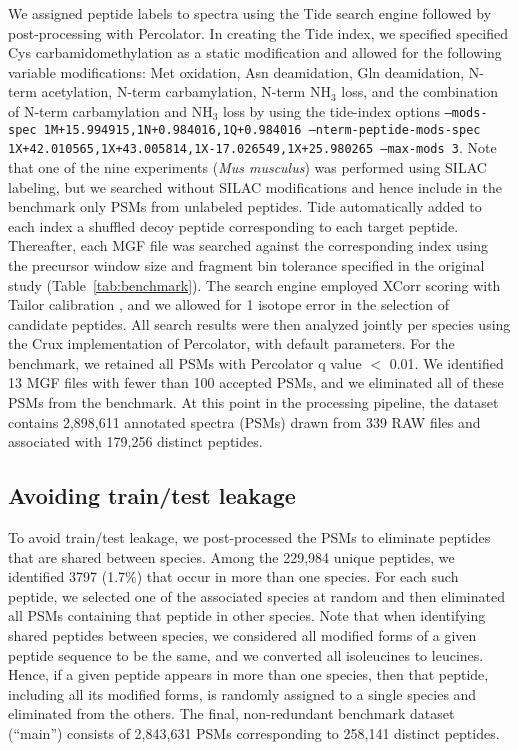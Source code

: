 \documentclass{article}
\begin{document}
We assigned peptide labels to spectra using the Tide search engine followed by post-processing with Percolator.
In creating the Tide index, we specified specified Cys carbamidomethylation as a static modification and allowed for the following variable modifications: Met oxidation, Asn deamidation, Gln deamidation, N-term acetylation, N-term carbamylation, N-term NH$_{3}$ loss, and the combination of N-term carbamylation and NH$_{3}$ loss by using the tide-index options {\tt --mods-spec 1M+15.994915,\allowbreak 1N+0.984016,\allowbreak 1Q+0.984016 --nterm-peptide-mods-spec 1X+42.010565,\allowbreak 1X+43.005814,\allowbreak 1X-17.026549,\allowbreak 1X+25.980265 --max-mods 3}.
Note that one of the nine experiments (\textit{Mus musculus}) was performed using SILAC labeling, but we searched without SILAC modifications and hence include in the benchmark only PSMs from unlabeled peptides.
Tide automatically added to each index a shuffled decoy peptide corresponding to each target peptide.
Thereafter, each MGF file was searched against the corresponding index using the precursor window size and fragment bin tolerance specified in the original study (Table~\ref{tab:benchmark}).
The search engine employed XCorr scoring with Tailor calibration \cite{sulimov2020tailor}, and we allowed for 1 isotope error in the selection of candidate peptides.
All search results were then analyzed jointly per species using the Crux implementation of Percolator, with default parameters.
For the benchmark, we retained all PSMs with Percolator q value $<$ 0.01.
We identified 13 MGF files with fewer than 100 accepted PSMs, and we eliminated all of these PSMs from the benchmark.
At this point in the processing pipeline, the dataset contains 2,898,611 annotated spectra (PSMs)  drawn from 339 RAW files and associated with 179,256 distinct peptides.

\subsection*{Avoiding train/test leakage}

To avoid train/test leakage, we post-processed the PSMs to eliminate peptides that are shared between species.
Among the 229,984 unique peptides, we identified 3797 (1.7\%) that occur in more than one species.
For each such peptide, we selected one of the associated species at random and then eliminated all PSMs containing that peptide in other species.
Note that when identifying shared peptides between species, we considered all modified forms of a given peptide sequence to be the same, and we converted all isoleucines to leucines.
Hence, if a given peptide appears in more than one species, then that peptide, including all its modified forms, is randomly assigned to a single species and eliminated from the others.
The final, non-redundant benchmark dataset (``main'') consists of 2,843,631 PSMs corresponding to 258,141 distinct peptides.
\end{document}
